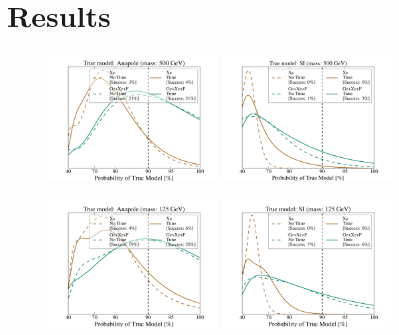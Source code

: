 \documentclass[11pt]{article}
\begin{document}
\section{Results}\label{sec:results}
\begin{figure}
\centering
\includegraphics[width=0.4\textwidth, trim=.6cm 0.0cm .6cm 0.0cm,clip=true]{plots/PDF_Single_500GeV_Anapole_50sims_Xe_vs_FGeXe_GF_TNT.pdf}
\includegraphics[width=0.4\textwidth, trim=.6cm 0.0cm .6cm 0.0cm,clip=true]{plots/PDF_Single_500GeV_SI_Higgs_50sims_Xe_vs_FGeXe_GF_TNT.pdf}

\includegraphics[width=0.4\textwidth, trim=.6cm 0.0cm .6cm 0.0cm,clip=true]{plots/PDF_Single_125GeV_Anapole_50sims_Xe_vs_FGeXe_GF_TNT.pdf}
\includegraphics[width=0.4\textwidth, trim=.6cm 0.0cm .6cm 0.0cm,clip=true]{plots/PDF_Single_125GeV_SI_Higgs_50sims_Xe_vs_FGeXe_GF_TNT.pdf}


\end{figure}
\end{document}
